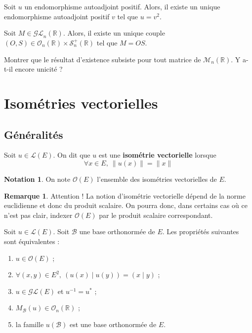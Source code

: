 \documentclass[french]{article}
\newcommand{\R}{\mathbb{R}}
\newcommand{\st}{^*}
\newcommand{\inv}{^{-1}}
\theoremstyle{plain}
\theoremstyle{definition}
\newtheorem*{rmq}{Remarque}
\newtheorem*{notation}{Notation}
\theoremstyle{remark}
\begin{document}
\begin{thm}
	Soit $u$ un endomorphisme autoadjoint positif. Alors, il existe un unique endomorphisme autoadjoint positif $v$ tel que $u=v^2$.
\end{thm}

\begin{cor}
	Soit $M\in\mathcal{GL}_n(\R)$. Alors, il existe un unique couple $(O,S)\in\mathcal{O}_n(\R)\times\mathcal{S}_n^{+}(\R)$ tel que $M=OS$.
\end{cor}

\begin{exo}
	Montrer que le résultat d'existence subsiste pour tout matrice de $\mathcal{M}_n(\R)$. Y a-t-il encore unicité ?
\end{exo}

\section{Isométries vectorielles}

\subsection{Généralités}

\begin{dfn}
	Soit $u\in\mathcal{L}(E)$. On dit que $u$ est une \textbf{isométrie vectorielle} lorsque $$\forall x\in E,\ \lVert u(x)\rVert=\lVert x\rVert$$
\end{dfn}

\begin{notation}
	On note $\mathcal{O}(E)$ l'ensemble des isométries vectorielles de $E$.
\end{notation}

\begin{rmq}
	Attention ! La notion d'isométrie vectorielle dépend de la norme euclidienne et donc du produit scalaire. On pourra donc, dans certains cas où ce n'est pas clair, indexer $\mathcal{O}(E)$ par le produit scalaire correspondant.
\end{rmq}

\begin{prop}
	Soit $u\in\mathcal{L}(E)$. Soit $\mathcal{B}$ une base orthonormée de $E$. Les propriétés suivantes sont équivalentes : \begin{enumerate}[label=(\roman*)]
		\item $u\in\mathcal{O}(E)$ ;
		\item $\forall (x,y)\in E^2,\ \left(u(x)\mid u(y)\right)=(x\mid y)$ ;
		\item $u\in\mathcal{GL}(E)$ et $u\inv=u\st$ ;
		\item $M_\mathcal{B}(u)\in\mathcal{O}_n(\R)$ ;
		\item la famille $u(\mathcal{B})$ est une base orthonormée de $E$.
	\end{enumerate}
\end{prop}
\end{document}
